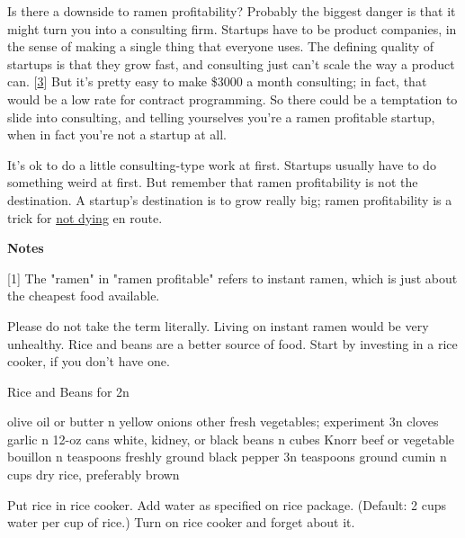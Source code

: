 Is there a downside to ramen
                    profitability? Probably the biggest danger is that it might
                    turn you into a consulting firm. Startups have to be product
                    companies, in the sense of making a single thing that
                    everyone uses. The defining quality of startups is that they
                    grow fast, and consulting just can't scale the way a product
                    can.
                    [\href{\#f3n}{3}]
                    But it's pretty easy to make \$3000 a month consulting; in
                    fact, that would be a low rate for contract programming. So
                    there could be a temptation to slide into consulting, and
                    telling yourselves you're a ramen profitable startup, when
                    in fact you're not a startup at all.

It's ok to
                    do a little consulting-type work at first. Startups usually
                    have to do something weird at first. But remember that ramen
                    profitability is not the destination. A startup's
                    destination is to grow really big; ramen profitability is a
                    trick for \href{http://www.paulgraham.com/die.html}{not dying} en route.





\textbf{Notes}

[1] The "ramen" in "ramen profitable" refers to instant
                    ramen, which is just about the cheapest food available.

Please
                    do not take the term literally. Living on instant ramen
                    would be very unhealthy. Rice and beans are a better source
                    of food. Start by investing in a rice cooker, if you don't
                    have one.

Rice and Beans for 2n
                  

                    olive oil or butter
  n yellow onions
  other fresh vegetables; experiment
  3n cloves garlic
  n 12-oz cans white, kidney, or black beans
  n cubes Knorr beef or vegetable bouillon
  n teaspoons freshly ground black pepper
  3n teaspoons ground cumin
  n cups dry rice, preferably brown

                  Put rice in rice cooker. Add water as specified on rice
                  package. (Default: 2 cups water per cup of rice.) Turn on rice
                  cooker and forget about it.

